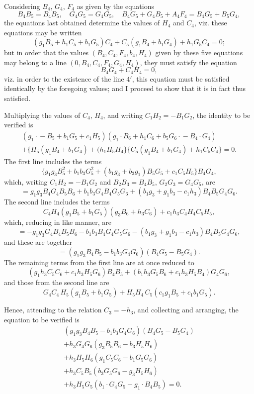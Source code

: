 \documentclass[11pt,a4paper]{article}
\begin{document}
Considering $B_{4}$, $G_{4}$, $F_{4}$ as given by the equations
\[
B_{4}B_{5} = B_{4}B_{5},\quad G_{4}G_{5} = G_{4}G_{5},\quad B_{4}G_{5}+G_{4}B_{5}+A_{4}F_{4} = B_{4}G_{5}+B_{5}G_{4},
\]
the equations last obtained determine the values of $H_{4}$ and $C_{4}$, viz. these equations may be written
\[
(g_{1}B_{5}+h_{1}C_{5}+b_{1}G_{5})C_{4} + C_{5}(g_{1}B_{4}+b_{1}G_{4}) + h_{1}G_{5}C_{4} = 0;
\]
but in order that the values $(B_{4}, C_{4}, F_{4}, b_{4}, H_{4})$ given by these five equations may belong to a line $(0, B_{4}, C_{4}, F_{4}, G_{4}, H_{4})$, they must satisfy the equation
\[
B_{4}G_{4} + C_{4}H_{4} = 0,
\]
viz. in order to the existence of the line $4'$, this equation must be satisfied identically by the foregoing values; and I proceed to show that it is in fact thus satisfied.

Multiplying the values of $C_{4}$, $H_{4}$, and writing $C_{1}H_{2} = -B_{1}G_{2}$, the identity to be verified is
\begin{multline*}
(g_{1}\!\cdot\!-B_{5} + b_{1}G_{5} + c_{1}H_{5})(g_{1}\!\cdot\!B_{6} + h_{1}C_{6} + b_{5}G_{6}\cdot\!-B_{4}\!\cdot\!G_{4})\\
+ \{H_{5}(g_{1}B_{4}+b_{1}G_{4}) + (h_{1}H_{5}H_{4}\}\{C_{5}(g_{1}B_{4}+b_{1}G_{4}) + h_{1}C_{5}C_{4}\} = 0.
\end{multline*}
The first line includes the terms
\[
\{g_{1}g_{3}B_{5}^{2} + b_{1}b_{3}G_{5}^{2} + (b_{1}g_{3}+b_{3}g_{1})B_{5}G_{5} + c_{1}C_{5}H_{5}\}B_{4}G_{4},
\]
which, writing $C_{1}H_{2} = -B_{1}G_{2}$ and $B_{2}B_{3} = B_{4}B_{5}$, $G_{2}G_{3} = G_{4}G_{5}$, are
\[
= g_{1}g_{3}B_{4}G_{4}B_{5}B_{6} + b_{1}b_{3}G_{4}B_{4}G_{5}G_{6} + (b_{1}g_{3}+g_{1}b_{3}-c_{1}h_{3})B_{4}B_{5}G_{4}G_{6}.
\]
The second line includes the terms
\[
C_{4}H_{4}(g_{1}B_{5}+b_{1}G_{5})(g_{3}B_{6}+h_{3}C_{6}) + c_{1}h_{3}C_{4}H_{4}C_{5}H_{5},
\]
which, reducing in like manner, are
\[
= -g_{1}g_{3}G_{4}B_{4}B_{5}B_{6} - b_{1}b_{3}B_{4}G_{4}G_{5}G_{6} - (b_{1}g_{3}+g_{1}b_{3}-c_{1}h_{3})B_{4}B_{5}G_{4}G_{6},
\]
and these are together
\[
= (g_{1}g_{3}B_{4}B_{5} - b_{1}b_{3}G_{4}G_{6})(B_{4}G_{5} - B_{5}G_{4}).
\]
The remaining terms from the first line are at once reduced to
\[
(g_{1}h_{3}C_{5}C_{6} + c_{1}h_{3}H_{5}G_{6})B_{4}B_{5} + (b_{1}h_{3}G_{5}B_{6} + c_{1}h_{3}H_{5}B_{4})G_{4}G_{6},
\]
and those from the second line are
\[
G_{4}C_{4}\, H_{5}(g_{1}B_{5}+b_{1}G_{5}) + H_{5}H_{4}\, C_{5}(c_{1}g_{1}B_{5}+c_{1}b_{1}G_{5}).
\]

Hence, attending to the relation $C_{3} = -h_{3}$, and collecting and arranging, the equation to be verified is
\begin{multline*}
(g_{1}g_{3}B_{4}B_{5} - b_{1}b_{3}G_{4}G_{6})(B_{4}G_{5} - B_{5}G_{4})\\
+ h_{3}G_{4}G_{6}(g_{3}B_{5}B_{6} - b_{3}H_{5}H_{6})\\
+ h_{3}H_{5}H_{6}(g_{1}C_{5}C_{6} - b_{1}G_{5}G_{6})\\
+ h_{3}C_{5}B_{5}(b_{3}G_{5}G_{6} - g_{3}H_{5}H_{6})\\
+ h_{3}H_{5}G_{5}(b_{1}\!\cdot\!G_{4}G_{5} - g_{1}\!\cdot\!B_{4}B_{5}) = 0.
\end{multline*}
\end{document}
